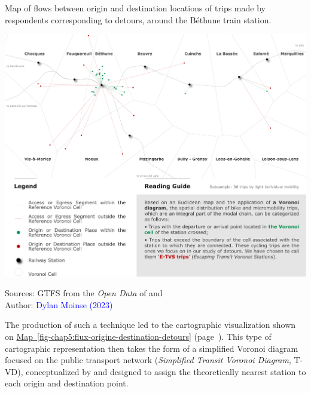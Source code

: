 \begin{refsegment}
    \begin{carte}[h!]\vspace*{4pt}
        \caption{Map of flows between origin and destination locations of trips made by respondents corresponding to detours, around the Béthune train station.}
        \label{fig-chap5:flux-origine-destination-detours}
        \centerline{\includegraphics[width=1\columnwidth]{src/Figures/Chap-5/EN_Detours_Diagramme_Voronoi.pdf}}
        \vspace{5pt}
        \begin{flushright}\scriptsize{
        Sources: \acrshort{GTFS} from the \textsl{Open Data} of \textcolor{blue}{\textcite{sncf_sncf_2022}} and \textcolor{blue}{\textcite{metropole_europeenne_de_lille_opendata_2021}}
        \\
        Author: \textcolor{blue}{Dylan Moinse (2023)}
        }\end{flushright}
    \end{carte}

The production of such a technique led to the cartographic visualization shown on \hyperref[fig-chap5:flux-origine-destination-detours]{Map~\ref{fig-chap5:flux-origine-destination-detours}} (page~\pageref{fig-chap5:flux-origine-destination-detours}). This type of cartographic representation then takes the form of a simplified Voronoi diagram focused on the public transport network (\textsl{Simplified Transit Voronoi Diagram}, T-VD), conceptualized by \textcolor{blue}{\textcite[5]{chen_transit_2022}} and designed to assign the theoretically nearest station to each origin and destination point.%


\end{refsegment}
